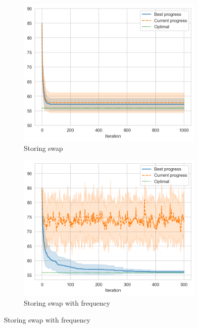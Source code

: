 \begin{figure}[ht]
    \hfill
    \begin{subfigure}{0.48\textwidth}
        \centering
        \includegraphics[width=\textwidth]{../images/p4/store-pair.png}
        \caption{Storing swap}
    \end{subfigure}
    \hfill
    \begin{subfigure}{0.48\textwidth}
        \centering
        \includegraphics[width=\textwidth]{../images/p4/store-freq-base.png}
        \caption{Storing swap with frequency}
    \end{subfigure}
    \hfill


\end{figure}
